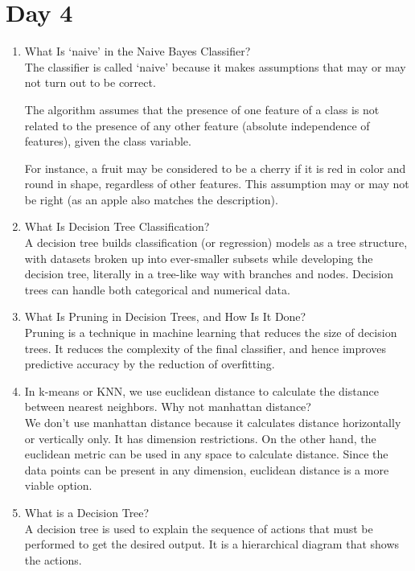 \documentclass[11pt]{article}
\begin{document}
\section{Day 4}
\begin{enumerate}
\item What Is ‘naive’ in the Naive Bayes Classifier?\\[.5em]
The classifier is called ‘naive’ because it makes assumptions that may or may not turn out to be
correct.

The algorithm assumes that the presence of one feature of a class is not related to the presence
of any other feature (absolute independence of features), given the class variable.

For instance, a fruit may be considered to be a cherry if it is red in color and round in shape,
regardless of other features. This assumption may or may not be right (as an apple also
matches the description).

\item What Is Decision Tree Classification?\\[.5em]
A decision tree builds classification (or regression) models as a tree structure, with datasets
broken up into ever-smaller subsets while developing the decision tree, literally in a tree-like
way with branches and nodes. Decision trees can handle both categorical and numerical data.

\item What Is Pruning in Decision Trees, and How Is It Done?\\[.5em]
Pruning is a technique in machine learning that reduces the size of decision trees. It reduces the
complexity of the final classifier, and hence improves predictive accuracy by the reduction of
overfitting.

\item In k-means or KNN, we use euclidean distance to calculate the distance
between nearest neighbors. Why not manhattan distance?\\[.5em]
We don’t use manhattan distance because it calculates distance horizontally or vertically only. It
has dimension restrictions. On the other hand, the euclidean metric can be used in any space to
calculate distance. Since the data points can be present in any dimension, euclidean distance is
a more viable option.
\item What is a Decision Tree?\\[.5em]
A decision tree is used to explain the sequence of actions that must be performed to get the
desired output. It is a hierarchical diagram that shows the actions.
\end{enumerate}
\pagebreak
\end{document}
